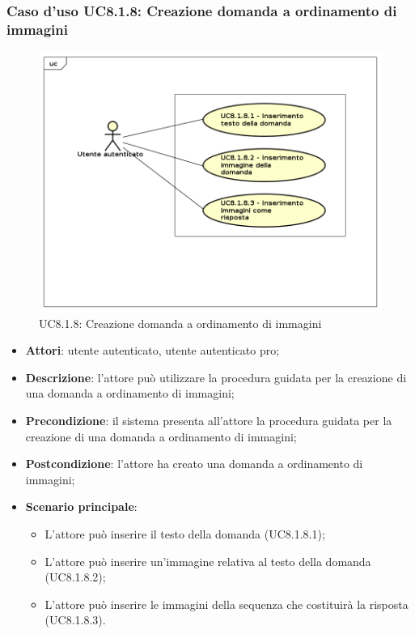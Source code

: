 \subsubsection{Caso d'uso UC8.1.8: Creazione domanda a ordinamento di immagini}
\label{UC8.1.8}
	\begin{figure}[h]
		\centering
			\includegraphics[scale=0.45,keepaspectratio]{UML/UC8_1_8.png}
		\caption{UC8.1.8: Creazione domanda a ordinamento di immagini}
	\end{figure}
	\FloatBarrier
\begin{itemize}
	\item\textbf{Attori}: utente autenticato, utente autenticato pro;
	\item\textbf{Descrizione}: l'attore può utilizzare la procedura guidata per la creazione di una domanda a ordinamento di immagini;
	\item\textbf{Precondizione}: il sistema presenta all'attore la procedura guidata per la creazione di una domanda a ordinamento di immagini; 
	\item \textbf{Postcondizione}: l'attore ha creato una domanda a ordinamento di immagini;
	\item\textbf{Scenario principale}:
	\begin{itemize}
		\item L'attore può inserire il testo della domanda (UC8.1.8.1);
		\item L'attore può inserire un'immagine relativa al testo della domanda (UC8.1.8.2);
		\item L'attore può inserire le immagini della sequenza che costituirà la risposta (UC8.1.8.3).
	\end{itemize}
\end{itemize}

